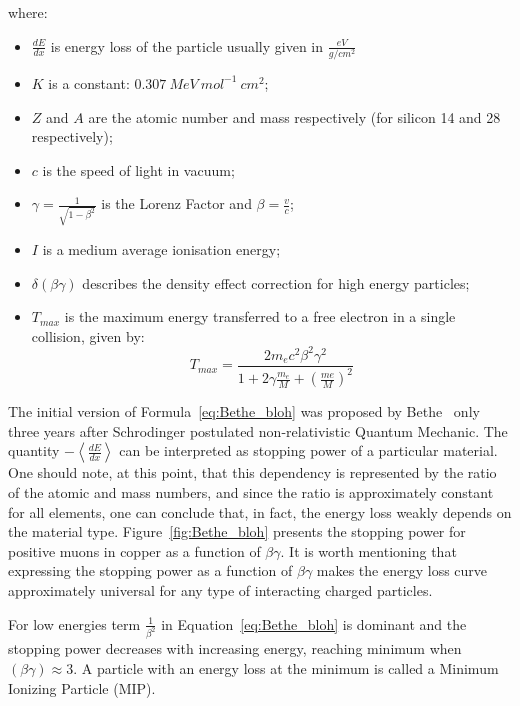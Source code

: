 where: 
\begin{itemize}
    \item $\frac{dE}{dx}$ is energy loss of the particle usually given in $\frac{eV}{g/cm^{2}}$
    \item $K$ is a constant: $0.307~ MeV~ mol^{-1}~ cm^2$;
    \item $Z$ and $A$ are the atomic number and mass respectively (for silicon 14 and 28 respectively);
    \item $c$ is the speed of light in vacuum;
    \item $\gamma = \frac{1}{\sqrt{1-\beta^2}}$ is the Lorenz Factor and $\beta = \frac{v}{c}$;
    \item $I$ is a medium average ionisation energy;
    \item $\delta(\beta \gamma)$ describes the density effect correction for high energy particles; 
    \item $T_{max}$ is the maximum energy transferred to a free electron in a single collision, given by:
    \begin{equation}
        T_{max} = \frac{2m_e c^2 \beta^2 \gamma^2}{1+2\gamma \frac{m_e}{M}+ (\frac{me}{M})^2}
    \end{equation}
\end{itemize}

The initial version of Formula~\ref{eq:Bethe_bloh} was proposed by Bethe~\cite{Bethe} only three years after Schrodinger postulated non-relativistic Quantum Mechanic. The quantity $-\left< \frac{dE}{dx} \right>$ can be interpreted as stopping power of a particular material. One should note, at this point, that this dependency is represented by the ratio of the atomic and mass numbers, and since the ratio is approximately constant for all elements, one can conclude that, in fact, the energy loss weakly depends on the material type. Figure~\ref{fig:Bethe_bloh} presents the stopping power for positive muons in copper as a function of $\beta \gamma$. It is worth mentioning that expressing the stopping power as a function of $\beta \gamma$ makes the energy loss curve approximately universal for any type of interacting charged particles.

For low energies term $\frac{1}{\beta^2}$ in Equation~\ref{eq:Bethe_bloh} is dominant and the stopping power decreases with increasing energy, reaching minimum when $(\beta \gamma) \approx 3 $. A particle with an energy loss at the minimum is called a Minimum Ionizing Particle (MIP). 

